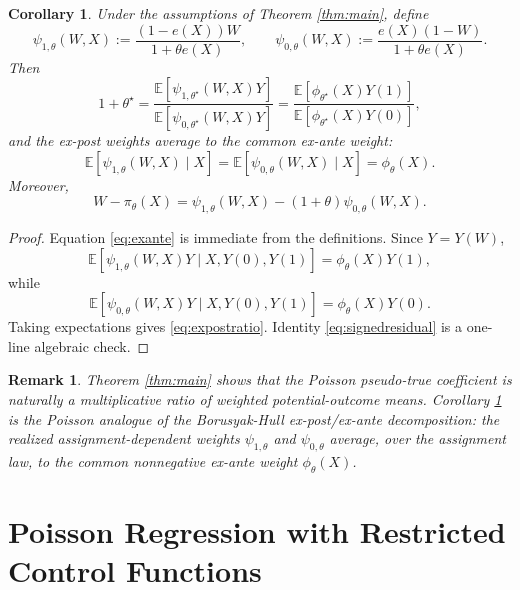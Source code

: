 \documentclass[11pt]{article}
\newtheorem{corollary}[theorem]{Corollary}
\newtheorem{remark}[theorem]{Remark}
\newcommand{\E}{\mathbb{E}}
\newcommand{\1}{\mathbf{1}}
\begin{document}
\begin{corollary}
\label{cor:expost}
Under the assumptions of Theorem \ref{thm:main}, define
\begin{equation}
\psi_{1,\theta}(W,X):=\frac{(1-e(X))W}{1+\theta e(X)},
\qquad
\psi_{0,\theta}(W,X):=\frac{e(X)(1-W)}{1+\theta e(X)}.
\label{eq:positiveweights}
\end{equation}
Then
\begin{equation}
1+\theta^\star
=
\frac{\E[\psi_{1,\theta^\star}(W,X)Y]}{\E[\psi_{0,\theta^\star}(W,X)Y]}
=
\frac{\E[\phi_{\theta^\star}(X)Y(1)]}{\E[\phi_{\theta^\star}(X)Y(0)]},
\label{eq:expostratio}
\end{equation}
and the ex-post weights average to the common ex-ante weight:
\begin{equation}
\E[\psi_{1,\theta}(W,X)\mid X]=\E[\psi_{0,\theta}(W,X)\mid X]=\phi_\theta(X).
\label{eq:exante}
\end{equation}
Moreover,
\begin{equation}
W-\pi_\theta(X)=\psi_{1,\theta}(W,X)-(1+\theta)\psi_{0,\theta}(W,X).
\label{eq:signedresidual}
\end{equation}
\end{corollary}

\begin{proof}
Equation \eqref{eq:exante} is immediate from the definitions. Since $Y=Y(W)$,
\[
\E[\psi_{1,\theta}(W,X)Y\mid X,Y(0),Y(1)]
=
\phi_\theta(X)Y(1),
\]
while
\[
\E[\psi_{0,\theta}(W,X)Y\mid X,Y(0),Y(1)]
=
\phi_\theta(X)Y(0).
\]
Taking expectations gives \eqref{eq:expostratio}. Identity \eqref{eq:signedresidual} is a one-line algebraic check.
\end{proof}

\begin{remark}
Theorem \ref{thm:main} shows that the Poisson pseudo-true coefficient is naturally a \emph{multiplicative ratio} of weighted potential-outcome means. Corollary \ref{cor:expost} is the Poisson analogue of the Borusyak-Hull ex-post/ex-ante decomposition: the realized assignment-dependent weights $\psi_{1,\theta}$ and $\psi_{0,\theta}$ average, over the assignment law, to the common nonnegative ex-ante weight $\phi_\theta(X)$.
\end{remark}

\section{Poisson Regression with Restricted Control Functions}
\end{document}
